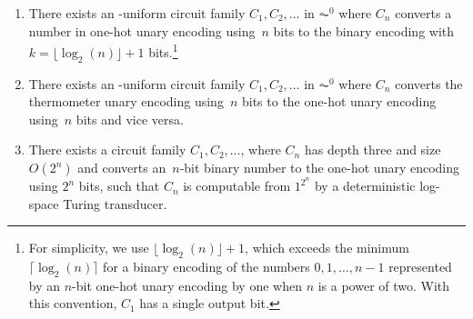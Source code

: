 \begin{proposition}
\label{prelim:AC0converters-numbers}	
\begin{enumerate}
\item \label{prelim:AC0converters-numbers:item:onehotbin} There exists an \LOGSPACE-uniform circuit family $C_1, C_2, \ldots$ in  $\AC^0$ 
 where $C_n$ converts a number in one-hot unary encoding using~$n$ bits
 to the binary encoding with $k = \lfloor \log_2(n) \rfloor + 1$ bits.\footnote{For simplicity, we 
 	use $\lfloor \log_2(n) \rfloor + 1$, which exceeds the minimum
 	$\lceil \log_2(n) \rceil$ for a binary encoding of the numbers $0,1,\ldots,n-1$
 	represented by an $n$-bit one-hot unary encoding
 	by one when $n$ is a power of two.
 	With this convention, $C_1$ has a single output bit.}

\item \label{prelim:AC0converters-numbers:item:onehottherm} There exists an \LOGSPACE-uniform 
circuit family $C_1, C_2, \ldots$ in  $\AC^0$ where $C_n$ converts
the thermometer unary encoding using~$n$ bits to the one-hot unary encoding using~$n$ bits and vice versa.		

\item \label{prelim:AC0converters-numbers:item:binonehot} There exists a circuit family $C_1, C_2, \ldots$,
where $C_n$ has depth three and size $O(2^n)$ and converts an~$n$-bit binary number
to the one-hot unary encoding using $2^n$ bits,
such that $C_n$ is computable from $1^{2^n}$ by a deterministic log-space Turing transducer.

\end{enumerate}
\end{proposition}
